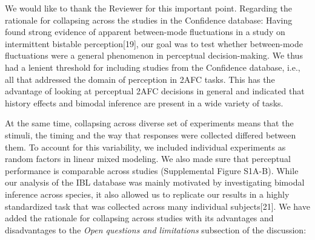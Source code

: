 \documentclass[
]{article}
\begin{document}
We would like to thank the Reviewer for this important point. Regarding
the rationale for collapsing across the studies in the Confidence
database: Having found strong evidence of apparent between-mode
fluctuations in a study on intermittent bistable perception{[}19{]}, our
goal was to test whether between-mode fluctuations were a general
phenomenon in perceptual decision-making. We thus had a lenient
threshold for including studies from the Confidence database, i.e., all
that addressed the domain of perception in 2AFC tasks. This has the
advantage of looking at perceptual 2AFC decisions in general and
indicated that history effects and bimodal inference are present in a
wide variety of tasks.

At the same time, collapsing across diverse set of experiments means
that the stimuli, the timing and the way that responses were collected
differed between them. To account for this variability, we included
individual experiments as random factors in linear mixed modeling. We
also made sure that perceptual performance is comparable across studies
(Supplemental Figure S1A-B). While our analysis of the IBL database was
mainly motivated by investigating bimodal inference across species, it
also allowed us to replicate our results in a highly standardized task
that was collected across many individual subjects{[}21{]}. We have
added the rationale for collapsing across studies with its advantages
and disadvantages to the \emph{Open questions and limitations}
subsection of the discussion:
\end{document}
